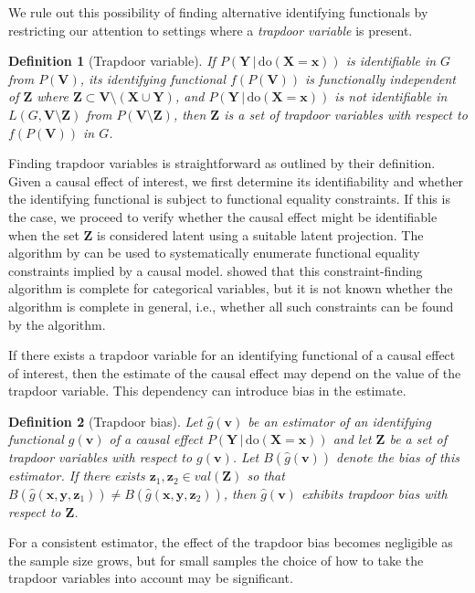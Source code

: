 \documentclass[11pt,a4paper,twoside]{article}
\newtheorem{definition}{Definition}
\newcommand{\+}[1]{\ensuremath{\mathbf{#1}}}
\newcommand{\doo}{\textrm{do}}
\newcommand{\given}{{ \, | \, }}
\newcommand{\z}{trapdoor variable}
\begin{document}
	We rule out this possibility of finding alternative identifying functionals by restricting our attention to settings where a \emph{trapdoor variable} is present.
	\begin{definition}[Trapdoor variable] If ${P(\+ Y \given \doo(\+ X = \+ x))}$ is identifiable in $G$ from $P(\+ V)$, its identifying functional $f(P(\+ V))$ is functionally independent of $\+ Z$ where $\+ Z \subset \+ V \setminus (\+ X \cup \+ Y)$, and $P(\+ Y \given \doo(\+ X = \+ x))$ is not identifiable in $L(G, \+ V \setminus \+ Z)$ from $P(\+ V \setminus \+ Z)$, then $\+ Z$ is a set of \emph{\z s} with respect to $f(P(\+ V))$ in $G$.
	\end{definition}
	Finding \z s is straightforward as outlined by their definition. Given a causal effect of interest, we first determine its identifiability and whether the identifying functional is subject to functional equality constraints. If this is the case, we proceed to verify whether the causal effect might be identifiable when the set $\+ Z$ is considered latent using a suitable latent projection. The algorithm by \citet{TianPearl2002} can be used to systematically enumerate functional equality constraints implied by a causal model. \citet{evans2018} showed that this constraint-finding algorithm is complete for categorical variables, but it is not known whether the algorithm is complete in general, i.e., whether all such constraints can be found by the algorithm.
	
	If there exists a trapdoor variable for an identifying functional of a causal effect of interest, then the estimate of the causal effect may depend on the value of the trapdoor variable. This dependency can introduce bias in the estimate.
	\begin{definition}[Trapdoor bias]
		Let $\hat g(\+ v)$ be an estimator of an identifying functional $g(\+ v)$ of a causal effect $P(\+ Y \given \doo(\+ X  = \+ x))$ and let $\+ Z$ be a set of trapdoor variables with respect to $g(\+ v)$. Let $B(\hat g(\+ v))$ denote the bias of this estimator. If there exists $\+ z_1, \+ z_2 \in val(\+ Z)$ so that $B(\hat g(\+ x,\+ y,\+z_1)) \neq B(\hat g(\+x, \+ y, \+ z_2))$, then $\hat g(\+ v)$ exhibits \emph{trapdoor bias} with respect to $\+ Z$.
	\end{definition}
	For a consistent estimator, the effect of the trapdoor bias becomes negligible as the sample size grows, but for small samples the choice of how to take the trapdoor variables into account may be significant. 
	
\end{document}
